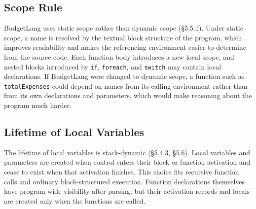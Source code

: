 \documentclass[11pt]{article}
\begin{document}
\subsection*{Scope Rule}
BudgetLang uses static scope rather than dynamic scope (\S5.5.1). Under static scope, a name is resolved by the textual block structure of the program, which improves readability and makes the referencing environment easier to determine from the source code. Each function body introduces a new local scope, and nested blocks introduced by \texttt{if}, \texttt{foreach}, and \texttt{switch} may contain local declarations. If BudgetLang were changed to dynamic scope, a function such as \texttt{totalExpenses} could depend on names from its calling environment rather than from its own declarations and parameters, which would make reasoning about the program much harder.

\subsection*{Lifetime of Local Variables}
The lifetime of local variables is stack-dynamic (\S5.4.3, \S5.6). Local variables and parameters are created when control enters their block or function activation and cease to exist when that activation finishes. This choice fits recursive function calls and ordinary block-structured execution. Function declarations themselves have program-wide visibility after parsing, but their activation records and locals are created only when the functions are called.
\end{document}
